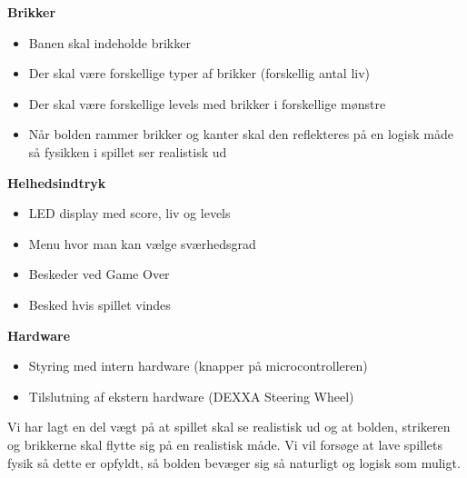 \textbf{Brikker}
\begin{itemize}
\item Banen skal indeholde brikker
\item Der skal være forskellige typer af brikker (forskellig antal liv)
\item Der skal være forskellige levels med brikker i forskellige mønstre
\item Når bolden rammer brikker og kanter skal den reflekteres på en logisk måde så fysikken i spillet ser realistisk ud
\end{itemize}

\textbf{Helhedsindtryk}
\begin{itemize}
\item LED display med score, liv og levels
\item Menu hvor man kan vælge sværhedsgrad
\item Beskeder ved Game Over
\item Besked hvis spillet vindes
\end{itemize}

\textbf{Hardware}
\begin{itemize}
\item Styring med intern hardware (knapper på microcontrolleren)
\item Tilslutning af ekstern hardware (DEXXA Steering Wheel)
\end{itemize}

Vi har lagt en del vægt på at spillet skal se realistisk ud og at bolden, strikeren og brikkerne skal flytte sig på en realistisk måde. Vi vil forsøge at lave spillets fysik så dette er opfyldt, så bolden bevæger sig så naturligt og logisk som muligt. 

\newpage